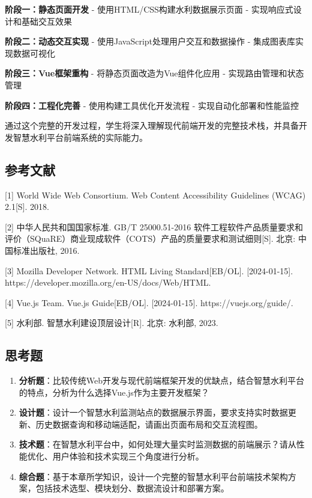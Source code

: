 \textbf{阶段一：静态页面开发} - 使用HTML/CSS构建水利数据展示页面 - 实现响应式设计和基础交互效果

\textbf{阶段二：动态交互实现} - 使用JavaScript处理用户交互和数据操作 - 集成图表库实现数据可视化

\textbf{阶段三：Vue框架重构} - 将静态页面改造为Vue组件化应用 - 实现路由管理和状态管理

\textbf{阶段四：工程化完善} - 使用构建工具优化开发流程 - 实现自动化部署和性能监控

通过这个完整的开发过程，学生将深入理解现代前端开发的完整技术栈，并具备开发智慧水利平台前端系统的实际能力。

\subsection{参考文献}\label{ux53c2ux8003ux6587ux732e}

{[}1{]} World Wide Web Consortium. Web Content Accessibility Guidelines (WCAG) 2.1{[}S{]}. 2018.

{[}2{]} 中华人民共和国国家标准. GB/T 25000.51-2016 软件工程软件产品质量要求和评价（SQuaRE）商业现成软件（COTS）产品的质量要求和测试细则{[}S{]}. 北京: 中国标准出版社, 2016.

{[}3{]} Mozilla Developer Network. HTML Living Standard{[}EB/OL{]}. {[}2024-01-15{]}. https://developer.mozilla.org/en-US/docs/Web/HTML.

{[}4{]} Vue.js Team. Vue.js Guide{[}EB/OL{]}. {[}2024-01-15{]}. https://vuejs.org/guide/.

{[}5{]} 水利部. 智慧水利建设顶层设计{[}R{]}. 北京: 水利部, 2023.

\subsection{思考题}\label{ux601dux8003ux9898}

\begin{enumerate}
\def\labelenumi{\arabic{enumi}.}
\item
  \textbf{分析题}：比较传统Web开发与现代前端框架开发的优缺点，结合智慧水利平台的特点，分析为什么选择Vue.js作为主要开发框架？
\item
  \textbf{设计题}：设计一个智慧水利监测站点的数据展示界面，要求支持实时数据更新、历史数据查询和移动端适配，请画出页面布局和交互流程图。
\item
  \textbf{技术题}：在智慧水利平台中，如何处理大量实时监测数据的前端展示？请从性能优化、用户体验和技术实现三个角度进行分析。
\item
  \textbf{综合题}：基于本章所学知识，设计一个完整的智慧水利平台前端技术架构方案，包括技术选型、模块划分、数据流设计和部署方案。
\end{enumerate}

